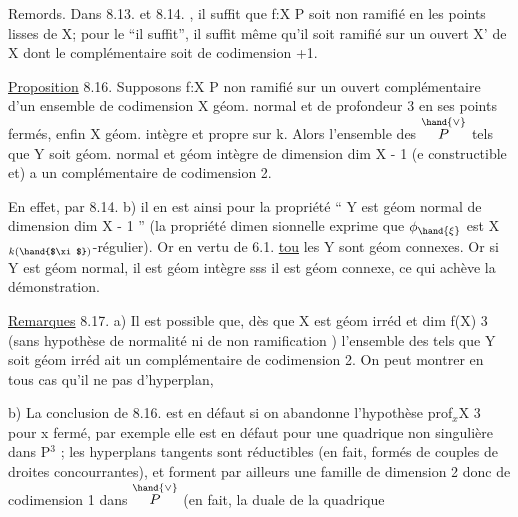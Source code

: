 

Remords. Dans 8.13. et 8.14. , il suffit  que f:X\hand{$\to$} P soit non
ramifié en les points lisses de X; pour le ``il suffit'', il suffit même
qu'il soit  ramifié sur un ouvert X' de X dont le complémentaire soit
de codimension \hand{$\geqslant$} +1.

\uline{Proposition} 8.16. Supposons f:X\hand{$\to$} P non ramifié sur un ouvert
complémentaire d'un ensemble de codimension  X géom. normal et
de profondeur\hand{$\geqslant$} 3 en ses points fermés, enfin X géom. intègre et propre
sur k. Alors l'ensemble des \hand{$\xi \in$} $\overset{\hand{\vee}}{P}$ tels que 
Y\hand{$_\xi$} soit géom. normal et géom intègre de dimension dim X - 1 (e
constructible et) a un complémentaire de codimension \hand{$\geqslant$} 2.

En effet, par 8.14. b) il en est ainsi pour la propriété
`` Y\hand{$_\xi$} est géom normal de dimension dim X - 1 '' (la propriété dimen
sionnelle exprime que $\phi_{\hand{\xi}}$ est X$_{k(\hand{$\xi$})}$-régulier). Or en vertu de 6.1.
\uline{tou} les Y\hand{$_\xi$} sont géom connexes. Or si Y\hand{$_\xi$} est géom normal, il est
géom intègre sss il est géom connexe, ce qui achève la démonstration.

\uline{Remarques} 8.17. a)  Il est possible que, dès que X est géom irréd
et dim f(X) \hand{$\geqslant$} 3 (sans hypothèse de normalité ni de non ramification )
l'ensemble des \hand{$\xi$} tels que Y\hand{$_\xi$} soit géom irréd ait un complémentaire
de codimension \hand{$\geqslant$}2. On peut montrer en tous cas qu'il ne pas
d'hyperplan, 

b) La conclusion de 8.16. est en défaut si on abandonne
l'hypothèse prof$_x$X \hand{$\geqslant$} 3 pour x fermé, par exemple elle est en défaut pour
une quadrique non singulière  dans P$^3$ ;   les hyperplans tangents
 sont  réductibles (en fait, formés de couples de droites
concourrantes), et forment par ailleurs une famille de dimension 2
 donc de codimension 1 dans $\overset{\hand{\vee}}{P}$ (en fait, la duale de la quadrique  
